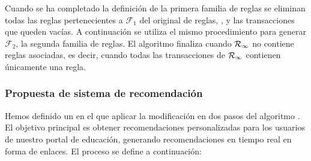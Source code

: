 Cuando se ha completado la definición de la primera familia de reglas se eliminan todas las reglas pertenecientes a $\mathcal{F}_1$ del \dataset original de reglas, \R, y las transacciones que queden vacías. A continuación se utiliza el mismo procedimiento para generar $\mathcal{F}_2$, la segunda familia de reglas. El algoritmo finaliza cuando $\R_\infty$ no contiene reglas asociadas, es decir, cuando todas las transacciones de $\R_\infty$ contienen únicamente una regla.



\subsubsection{Propuesta de sistema de recomendación}
Hemos definido un \sr en el que aplicar la modificación en dos pasos del algoritmo \apriori. El objetivo principal es obtener recomendaciones personalizadas para los usuarios de nuestro portal de educación, generando recomendaciones en tiempo real en forma de enlaces. El proceso se define a continuación:


